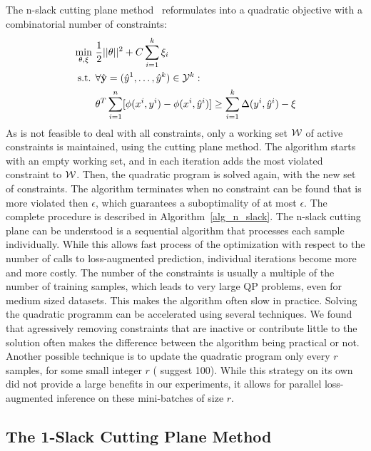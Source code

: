 The n-slack cutting plane method~\citep{tsochantaridis2006large} reformulates 
into a quadratic objective with a combinatorial number of constraints:
\begin{align}\label{eq:oneslack}
    \min_{\theta, \xi}\ &\frac{1}{2} ||\theta||^2 + C \sum_{i=1}^k \xi_i\\
    \text{s.t. }&\forall \hat{\mathbf{y}}=(\hat{y}^{1}, \dots, \hat{y}^{k}) \in \mathcal{Y}^k:\\
    &\theta^T \sum_{i=1}^n [\phi(x^{i}, y^{i}) - \phi(x^{i},
        \hat{y}^{i})] \geq \sum_{i=1}^k \Delta(y^{i}, \hat{y}^{i})
            - \xi
\end{align}
As is not feasible to deal with all constraints, only a working set $\mathcal{W}$ of active constraints
is maintained, using the cutting plane method. The algorithm starts with an empty working set,
and in each iteration adds the most violated constraint to $\mathcal{W}$. Then, the quadratic program is solved
again, with the new set of constraints.
The algorithm terminates when no constraint can be found that is more violated then $\epsilon$,
which guarantees a suboptimality of at most $\epsilon$.
%
The complete procedure is described in Algorithm~\ref{alg_n_slack}.
The n-slack cutting plane can be understood is a sequential algorithm that processes each sample individually.
While this allows fast process of the optimization with respect to the number of calls to loss-augmented prediction,
individual iterations become more and more costly. The number of the constraints is usually a multiple of
the number of training  samples, which leads to very large QP problems, even for medium sized datasets.
This makes the algorithm often slow in practice.
%
Solving the quadratic programm can be accelerated using several techniques. We found that
agressively removing constraints that are inactive or contribute little to the solution
often makes the difference between the algorithm being practical or not.
Another possible technique is to update the quadratic program only every $r$ samples, for some
small integer $r$ (\citet{joachims2009cutting} suggest 100). While this strategy on its own
did not provide a large benefits in our experiments, it allows for parallel loss-augmented
inference on these mini-batches of size $r$.

\subsection{The 1-Slack Cutting Plane Method}



